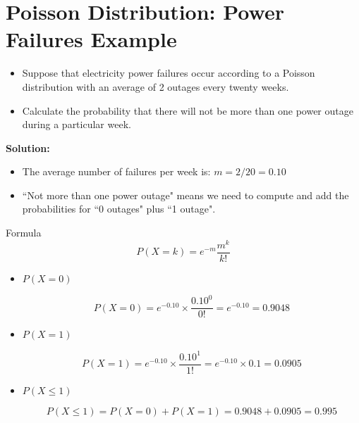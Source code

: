 



\section*{Poisson Distribution: Power Failures Example}
\begin{itemize}
	
	\item Suppose that electricity power failures occur according to a Poisson distribution
	with an average of 2 outages every twenty weeks. \item Calculate the probability that there will
	not be more than one power outage during a particular week.
\end{itemize}

\textbf{Solution:}

\begin{itemize}
	\item The average number of failures per week is: $m = 2/20 = 0.10$
	
	\item ``Not more than one  power outage" means we need to compute and add the probabilities for ``0 outages" plus ``1 outage".
\end{itemize}


\begin{framed}
Formula \[P(X = k) = e^{-m}\frac{m^k}{k!}\]
\end{framed}

\begin{itemize}
	
	\item $P(X = 0)$
	
	\[P(X = 0) = e^{-0.10} \times \frac{0.10^0}{0!} = e^{-0.10} = 0.9048\]
	
	
	\item $P(X = 1)$
	
	\[P(X = 1) = e^{-0.10}\times \frac{0.10^1}{1!} = e^{-0.10}\times 0.1 = 0.0905\]
	
	\item $P(X \leq 1)$
	
	\[P(X \leq 1) = P(X = 0) + P(X = 1) = 0.9048 + 0.0905 = 0.995\]
	
\end{itemize}	



